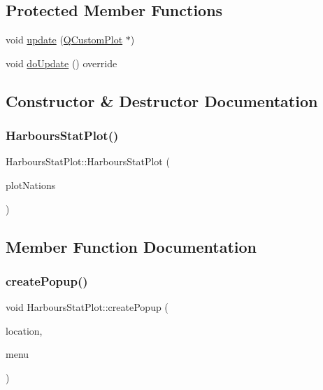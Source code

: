 \subsection*{Protected Member Functions}
\begin{DoxyCompactItemize}
\item 
void \mbox{\hyperlink{class_harbours_stat_plot_a0d016dd1f2ed1c70f7d49b7210e66041}{update}} (\mbox{\hyperlink{class_q_custom_plot}{Q\+Custom\+Plot}} $\ast$)
\item 
void \mbox{\hyperlink{class_harbours_stat_plot_ac00ff791bc72c0bf87c7c6832c24d162}{do\+Update}} () override
\end{DoxyCompactItemize}


\subsection{Constructor \& Destructor Documentation}
\mbox{\label{class_harbours_stat_plot_a5aa6a577b9530af1423e334f9d035297}} 
\subsubsection{\texorpdfstring{HarboursStatPlot()}{HarboursStatPlot()}}
{\footnotesize\ttfamily Harbours\+Stat\+Plot\+::\+Harbours\+Stat\+Plot (\begin{DoxyParamCaption}\item[{\mbox{\hyperlink{class_q_custom_plot}{Q\+Custom\+Plot}} $\ast$}]{plot\+Nations }\end{DoxyParamCaption})}



\subsection{Member Function Documentation}
\mbox{\label{class_harbours_stat_plot_a387865c6c454d4f9e14d4a99aacd55fb}} 
\subsubsection{\texorpdfstring{createPopup()}{createPopup()}}
{\footnotesize\ttfamily void Harbours\+Stat\+Plot\+::create\+Popup (\begin{DoxyParamCaption}\item[{\mbox{\hyperlink{class_graph_interaction_controller_a67e6eba082927bf2b984bed54fe32764}{Graph\+Interaction\+Controller\+::\+Popup\+Menu\+Location}}}]{location,  }\item[{Q\+Menu $\ast$}]{menu }\end{DoxyParamCaption})}


